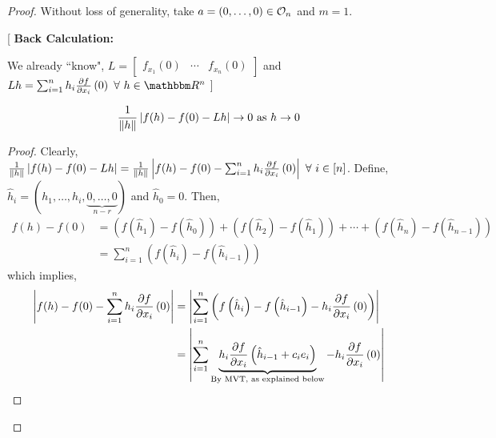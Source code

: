 \documentclass[../Analysis-3]{subfiles}
\begin{document}
\begin{proof}
  Without loss of generality, take $ a = (0,\ldots,0) \in \mathcal{O}_{n} $ and $ m = 1 $.
  
    [
      \textbf{Back Calculation:}
      
      We already ``know", $ L = \begin{bmatrix}
          f_{x_1}(0) & \cdots & f_{x_n}(0)
        \end{bmatrix} $ and $ Lh = \sum_{i=1}^{n}h_i\pdv{f}{x_i}\left( 0 \right)\ \forall\ h \in \R^n $
    ]
  
  \begin{clmBox}
    \[ \frac{1}{\norm{h}}\left| f(h)-f(0)-Lh \right| \to 0 \text{ as } h \to 0 \]
  \end{clmBox}
  
  \begin{proof}
    Clearly, $ \frac{1}{\norm{h}}\left| f(h)-f(0)-Lh \right| = \frac{1}{\norm{h}}\left| f(h)-f(0)-\sum_{i=1}^{n}h_i\pdv{f}{x_i}\left( 0 \right) \right|\ \forall\ i \in [n]$. Define, $ \hat{h}_i = (h_1, \ldots, h_i, \underbrace{0,\ldots,0}_{n-r}) $ and $ \hat{h}_0  = 0 $. Then,
    \begin{align*}
      f(h)-f(0) & = \left( f\left(\hat{h}_1\right) - f\left(\hat{h}_0\right) \right) + \left( f\left(\hat{h}_2\right) - f\left(\hat{h}_1\right) \right) + \cdots + \left( f\left(\hat{h}_{n}\right) - f\left(\hat{h}_{n-1}\right) \right) \\
                & =\sum_{i=1}^{n} \left( f\left(\hat{h}_{i}\right) - f\left(\hat{h}_{i-1}\right) \right)
    \end{align*}
    which implies, \begin{align*}
      \left| f(h)-f(0)-\sum_{i=1}^{n}h_i\pdv{f}{x_i}\left( 0 \right) \right| & = \left| \sum_{i=1}^{n} \left( f\left(\hat{h}_{i}\right) - f\left(\hat{h}_{i-1}\right) - h_i\pdv{f}{x_i}\left( 0 \right) \right) \right|                                 \\
                                                                             & = \left| \sum_{i=1}^{n} \underbrace{h_i\pdv{f}{x_i}\left( \hat{h}_{i-1} + c_ie_i \right)}_{\text{By MVT, as explained below}} - h_i\pdv{f}{x_i}\left( 0 \right) \right|
    \end{align*}
    

\end{proof}
\end{proof}
\end{document}
